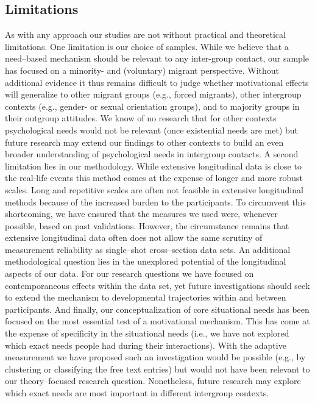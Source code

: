 \documentclass[man, 12pt, a4paper]{apa7}
\theoremstyle{break}
\theoremstyle{plain}
\begin{document}
\subsection{Limitations}
As with any approach our studies are not without practical and theoretical limitations. One limitation is our choice of samples. While we believe that a need–based mechanism should be relevant to any inter-group contact, our sample has focused on a minority- and (voluntary) migrant perspective. Without additional evidence it thus remains difficult to judge whether motivational effects will generalize to other migrant groups (e.g., forced migrants), other intergroup contexts (e.g., gender- or sexual orientation groups), and to majority groups in their outgroup attitudes. We know of no research that for other contexts psychological needs would not be relevant (once existential needs are met) but future research may extend our findings to other contexts to build an even broader understanding of psychological needs in intergroup contacts. A second limitation lies in our methodology. While extensive longitudinal data is close to the real-life events this method comes at the expense of longer and more robust scales. Long and repetitive scales are often not feasible in extensive longitudinal methods because of the increased burden to the participants. To circumvent this shortcoming, we have ensured that the measures we used were, whenever possible, based on past validations. However, the circumstance remains that extensive longitudinal data often does not allow the same scrutiny of measurement reliability as single–shot cross–section data sets. An additional methodological question lies in the unexplored potential of the longitudinal aspects of our data. For our research questions we have focused on contemporaneous effects within the data set, yet future investigations should seek to extend the mechanism to developmental trajectories within and between participants. And finally, our conceptualization of core situational needs has been focused on the most essential test of a motivational mechanism. This has come at the expense of specificity in the situational needs (i.e., we have not explored which exact needs people had during their interactions). With the adaptive measurement we have proposed such an investigation would be possible (e.g., by clustering or classifying the free text entries) but would not have been relevant to our theory–focused research question. Nonetheless, future research may explore which exact needs are most important in different intergroup contexts. 
\end{document}
